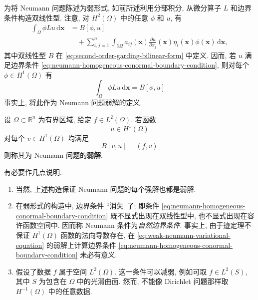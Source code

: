 为将 Neumann 问题陈述为弱形式, 如前所述利用分部积分, 从微分算子 $L$ 和边界条件构造双线性型. 注意, 对 $H^2(\Omega)$ 中的任意 $\phi$ 和 $u$, 有
\begin{equation}\label{eq:neumann-integration-by-parts-boundary-form}
\begin{aligned}
\int_\Omega\phi Lu\,\mathrm{d}\bm{x}&=B[\phi,u]\\
&\quad+\sum_{i,j=1}^n\int_{\partial\Omega}a_{ij}(\bm{x})\frac{\partial u}{\partial x_j}(\bm{x})\eta_i(\bm{x})\phi(\bm{x})\,\mathrm{d}\bm{x},
\end{aligned}
\end{equation}
其中双线性型 $B$ 在 \eqref{eq:second-order-garding-bilinear-form} 中定义. 因而, 若 $u$ 满足边界条件 \eqref{eq:neumann-homogeneous-conormal-boundary-condition}, 则对每个 $\phi\in H^1(\Omega)$ 有
\begin{equation}\label{eq:neumann-natural-variational-integration-identity}
\int_\Omega\phi Lu\,\mathrm{d}\bm{x}=B[\phi,u]
\end{equation}
事实上, 将此作为 Neumann 问题弱解的定义.

\begin{Definition}
\label{def:weak-neumann-solution}
设 $\Omega\subset\mathbb{R}^n$ 为有界区域, 给定 $f\in L^2(\Omega)$. 若函数\[u\in H^1(\Omega)\]对每个 $v\in H^1(\Omega)$ 均满足
\begin{equation}\label{eq:weak-neumann-variational-equation}
B[v,u]=(f,v)
\end{equation}
则称其为 Neumann 问题的\textbf{弱解}.
\end{Definition}

有必要作几点说明.\begin{enumerate}\item 当然, 上述构造保证 Neumann 问题的每个强解也都是弱解.\item 在弱形式的构造中, 边界条件 ``消失\textquotesingle\textquotesingle\ 了; 即条件 \eqref{eq:neumann-homogeneous-conormal-boundary-condition} 既不显式出现在双线性型中, 也不显式出现在容许函数空间中. 因而称 Neumann 条件为\emph{自然边界条件}. 事实上, 由于迹定理不保证 $H^1(\Omega)$ 函数的法向导数存在, 在 \eqref{eq:weak-neumann-variational-equation} 的弱解上计算边界条件 \eqref{eq:neumann-homogeneous-conormal-boundary-condition} 未必有意义.\item 假设了数据 $f$ 属于空间 $L^2(\Omega)$. 这一条件可以减弱, 例如可取 $f\in L^2(S)$, 其中 $S$ 为包含在 $\Omega$ 中的光滑曲面. 然而, 不能像 Dirichlet 问题那样取 $H^{-1}(\Omega)$ 中的任意数据.\end{enumerate}
